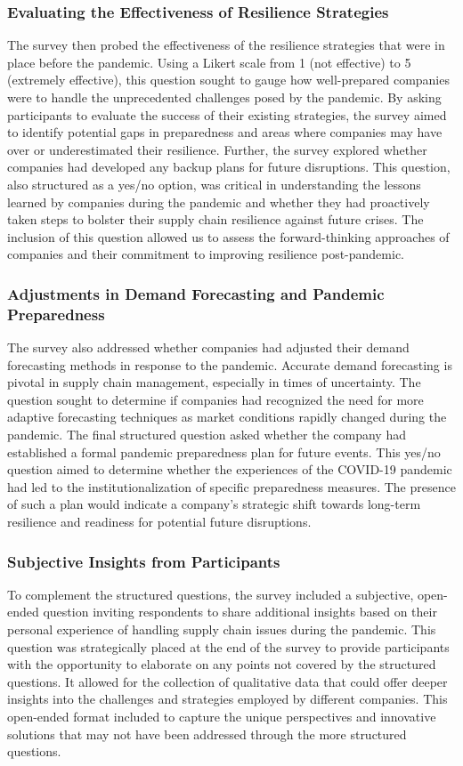 \subsubsection*{Evaluating the Effectiveness of Resilience Strategies}
The survey then probed the effectiveness of the resilience strategies that were in place before the pandemic. Using a Likert scale from 1 (not effective) to 5 (extremely effective), this question sought to gauge how well-prepared companies were to handle the unprecedented challenges posed by the pandemic. By asking participants to evaluate the success of their existing strategies, the survey aimed to identify potential gaps in preparedness and areas where companies may have over or underestimated their resilience. Further, the survey explored whether companies had developed any backup plans for future disruptions. This question, also structured as a yes/no option, was critical in understanding the lessons learned by companies during the pandemic and whether they had proactively taken steps to bolster their supply chain resilience against future crises. The inclusion of this question allowed us to assess the forward-thinking approaches of companies and their commitment to improving resilience post-pandemic.

\subsubsection*{Adjustments in Demand Forecasting and Pandemic Preparedness}
The survey also addressed whether companies had adjusted their demand forecasting methods in response to the pandemic. Accurate demand forecasting is pivotal in supply chain management, especially in times of uncertainty. The question sought to determine if companies had recognized the need for more adaptive forecasting techniques as market conditions rapidly changed during the pandemic. The final structured question asked whether the company had established a formal pandemic preparedness plan for future events. This yes/no question aimed to determine whether the experiences of the COVID-19 pandemic had led to the institutionalization of specific preparedness measures. The presence of such a plan would indicate a company’s strategic shift towards long-term resilience and readiness for potential future disruptions.

\subsubsection*{Subjective Insights from Participants}
To complement the structured questions, the survey included a subjective, open-ended question inviting respondents to share additional insights based on their personal experience of handling supply chain issues during the pandemic. This question was strategically placed at the end of the survey to provide participants with the opportunity to elaborate on any points not covered by the structured questions. It allowed for the collection of qualitative data that could offer deeper insights into the challenges and strategies employed by different companies. This open-ended format included to capture the unique perspectives and innovative solutions that may not have been addressed through the more structured questions.

